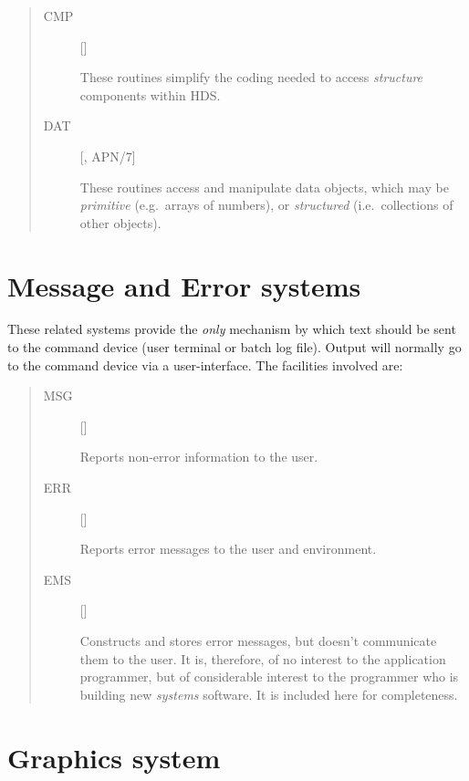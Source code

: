 \begin{quote}
\begin{description}
\item [CMP] \hfill []

 These routines simplify the coding needed to access {\em structure} components
 within HDS.

\item [DAT] \hfill [, APN/7]

 These routines access and manipulate data objects, which may be
 {\em primitive}\/ (e.g.\ arrays of numbers), or {\em structured}\/
 (i.e.\ collections of other objects).

\end{description}
\end{quote}

\section{Message and Error systems}
\label{S_errmess}

These related systems provide the {\em only} mechanism by which text should be
sent to the command device (user terminal or batch log file).
Output will normally go to the command device via a user-interface.
The facilities involved are:
\begin{quote}
\begin{description}

\item [MSG] \hfill []

 Reports non-error information to the user.

\item [ERR] \hfill []

 Reports error messages to the user and environment.

\item [EMS] \hfill []

 Constructs and stores error messages, but doesn't communicate them to the user.
 It is, therefore, of no interest to the application programmer, but of
 considerable interest to the programmer who is building new {\em systems}
 software.
 It is included here for completeness. 

\end{description}
\end{quote}

\section{Graphics system}
\label{S_graphics}

